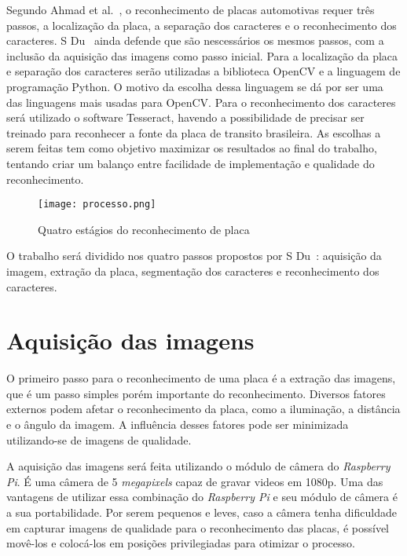 Segundo Ahmad et al.~\cite{ahmad2015automatic}, o reconhecimento de placas
automotivas requer três passos, a localização da placa, a separação dos
caracteres e o reconhecimento dos caracteres. S Du~\cite{s2013automatic} ainda
defende que são nescessários os mesmos passos, com a inclusão da aquisição das
imagens como passo inicial. Para a localização da placa e separação dos
caracteres serão utilizadas a biblioteca OpenCV e a linguagem de programação
Python. O motivo da escolha dessa linguagem se dá por ser uma das linguagens
mais usadas para OpenCV\@. Para o reconhecimento dos caracteres será utilizado o
software Tesseract, havendo a possibilidade de precisar ser treinado para
reconhecer a fonte da placa de transito brasileira. As escolhas a serem feitas
tem como objetivo maximizar os resultados ao final do trabalho, tentando criar
um balanço entre facilidade de implementação e qualidade do reconhecimento.

\begin{figure}[H]
	\centering
	\texttt{[image: processo.png]}
	\caption{Quatro estágios do reconhecimento de placa}
	\label{fig:processo}
\end{figure}

O trabalho será dividido nos quatro passos propostos por S
Du~\cite{s2013automatic}: aquisição da imagem, extração da placa, segmentação
dos caracteres e reconhecimento dos caracteres.

\section{Aquisição das imagens}
\label{sec:aquisicao}

O primeiro passo para o reconhecimento de uma placa é a extração das imagens,
que é um passo simples porém importante do reconhecimento. Diversos fatores
externos podem afetar o reconhecimento da placa, como a iluminação, a distância
e o ângulo da imagem. A influência desses fatores pode ser minimizada
utilizando-se de imagens de qualidade.

A aquisição das imagens será feita utilizando o módulo de câmera do
\emph{Raspberry Pi}. É uma câmera de 5 \emph{megapixels} capaz de gravar videos
em 1080p. Uma das vantagens de utilizar essa combinação do \emph{Raspberry Pi} e
seu módulo de câmera é a sua portabilidade. Por serem pequenos e leves, caso a
câmera tenha dificuldade em capturar imagens de qualidade para o reconhecimento
das placas, é possível movê-los e colocá-los em posições privilegiadas para
otimizar o processo.

